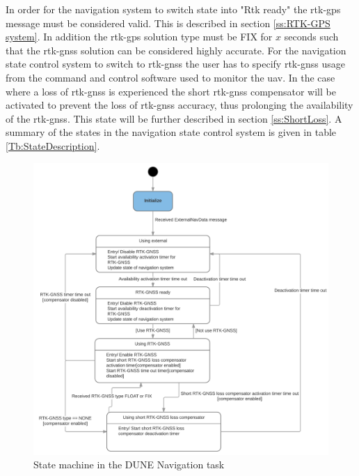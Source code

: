 In order for the navigation system to switch state into "Rtk ready" the \gls{rtk-gps} message must be considered valid. This is described in section \ref{ss:RTK-GPS system}. In addition the \gls{rtk-gps} solution type must be FIX for $x$ seconds such that the \gls{rtk-gnss} solution can be considered highly accurate. For the navigation state control system to switch to \gls{rtk-gnss} the user has to specify \gls{rtk-gnss} usage from the command and control software used to monitor the \gls{uav}. In the case where a loss of \gls{rtk-gnss} is experienced the short \gls{rtk-gnss} compensator will be activated to prevent the loss of \gls{rtk-gnss} accuracy, thus prolonging the availability of the \gls{rtk-gnss}. This state will be further described in section \ref{ss:ShortLoss}. A summary of the states in the navigation state control system is given in table \ref{Tb:StateDescription}.
\begin{figure}[H]
\includegraphics[scale=0.18]{figs/NavigationStateControl.png}
\caption{State machine in the DUNE Navigation task}
\label{Fig:NavState}
\end{figure}
